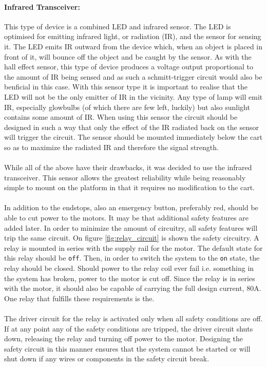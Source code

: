 \paragraph{Infrared Transceiver:} %
\label{par:infrared_transceiver}
This type of device is a combined LED and infrared sensor.
The LED is optimised for emitting infrared light, or radiation (IR), and the sensor for sensing it.
The LED emits IR outward from the device which, when an object is placed in front of it, will bounce off the object and be caught by the sensor.
As with the hall effect sensor, this type of device produces a voltage output proportional to the amount of IR being sensed and as such a schmitt-trigger circuit would also be benficial in this case.
With this sensor type it is important to realise that the LED will not be the only emitter of IR in the vicinity.
Any type of lamp will emit IR, especially glowbulbs (of which there are few left, luckily) but also sunlight contains some amount of IR.
When using this sensor the circuit should be designed in such a way that only the effect of the IR radiated back on the sensor will trigger the circuit.
The sensor should be mounted immediately below the cart so as to maximize the radiated IR and therefore the signal strength.
\\~\\
While all of the above have their drawbacks, it was decided to use the infrared transceiver.
This sensor allows the greatest reliability while being reasonably simple to mount on the platform in that it requires no modification to the cart.
\\~\\
In addition to the endstops, also an emergency button, preferably red, should be able to cut power to the motors.
It may be that additional safety features are added later.
In order to minimize the amount of circuitry, all safety features will trip the same circuit.
On figure \ref{fig:relay_circuit} is shown the safety circuitry.
A relay is mounted in series with the supply rail for the motor.
The default state for this relay should be \texttt{off}.
Then, in order to switch the system to the \texttt{on} state, the relay should be closed.
Should power to the relay coil ever fail i.e. something in the system has broken, power to the motor is cut off.
Since the relay is in series with the motor, it should also be capable of carrying the full design current, 80A.
One relay that fulfills these requirements is the.
\\~\\
The driver circuit for the relay is activated only when all safety conditions are off.
If at any point any of the safety conditions are tripped, the driver circuit shuts down, releasing the relay and turning off power to the motor.
Designing the safety circuit in this manner ensures that the system cannot be started or will shut down if any wires or components in the safety circuit break.

